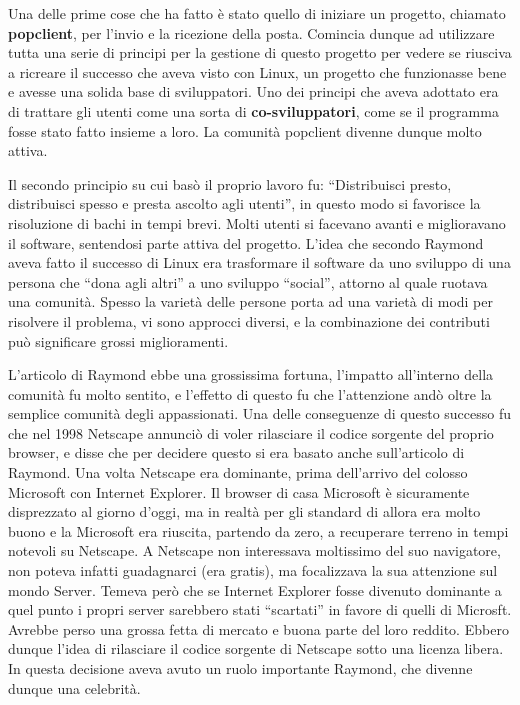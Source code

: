 Una delle prime cose che ha fatto è stato quello di iniziare un progetto, chiamato \textbf{popclient}, per l'invio e la ricezione della posta. Comincia dunque ad utilizzare tutta una serie di principi per la gestione di questo progetto per vedere se riusciva a ricreare il successo che aveva visto con Linux, un progetto che funzionasse bene e avesse una solida base di sviluppatori. Uno dei principi che aveva adottato era di trattare gli utenti come una sorta di \textbf{co-sviluppatori}, come se il programma fosse stato fatto insieme a loro. La comunità popclient divenne dunque molto attiva. 

Il secondo principio su cui basò il proprio lavoro fu: ``Distribuisci presto, distribuisci spesso e presta ascolto agli utenti'', in questo modo si favorisce la risoluzione di bachi in tempi brevi. Molti utenti si facevano avanti e miglioravano il software, sentendosi parte attiva del progetto. L'idea che secondo Raymond aveva fatto il successo di Linux era trasformare il software da uno sviluppo di una persona che ``dona agli altri'' a uno sviluppo ``social'', attorno al quale ruotava una comunità. Spesso la varietà delle persone porta ad una varietà di modi per risolvere il problema, vi sono approcci diversi, e la combinazione dei contributi può significare grossi miglioramenti.

L'articolo di Raymond ebbe una grossissima fortuna, l'impatto all'interno della comunità fu molto sentito, e l'effetto di questo fu che l'attenzione andò oltre la semplice comunità degli appassionati. Una delle conseguenze di questo successo fu che nel 1998 Netscape annunciò di voler rilasciare il codice sorgente del proprio browser, e disse che per decidere questo si era basato anche sull'articolo di Raymond. Una volta Netscape era dominante, prima dell'arrivo del colosso Microsoft con Internet Explorer. Il browser di casa Microsoft è sicuramente disprezzato al giorno d'oggi, ma in realtà per gli standard di allora era molto buono e la Microsoft era riuscita, partendo da zero, a recuperare terreno in tempi notevoli su Netscape. A Netscape non interessava moltissimo del suo navigatore, non poteva infatti guadagnarci (era gratis), ma focalizzava la sua attenzione sul mondo Server. Temeva però che se Internet Explorer fosse divenuto dominante a quel punto i propri server sarebbero stati ``scartati'' in favore di quelli di Microsft. Avrebbe perso una grossa fetta di mercato e buona parte del loro reddito. Ebbero dunque l'idea di rilasciare il codice sorgente di Netscape sotto una licenza libera. In questa decisione aveva avuto un ruolo importante Raymond, che divenne dunque una celebrità.

